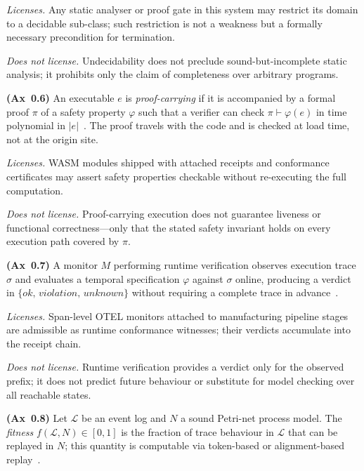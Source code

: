 \noindent\textit{Licenses.}
Any static analyser or proof gate in this system may restrict its domain to a
decidable sub-class; such restriction is not a weakness but a formally
necessary precondition for termination.

\noindent\textit{Does not license.}
Undecidability does not preclude sound-but-incomplete static analysis; it
prohibits only the claim of completeness over arbitrary programs.

\begin{axiom}\label{ax:pcc}
\textbf{(Ax~0.6)}
An executable $e$ is \emph{proof-carrying} if it is accompanied by a formal
proof $\pi$ of a safety property $\varphi$ such that a verifier can check
$\pi \vdash \varphi(e)$ in time polynomial in $|e|$~\cite{necula1997pcc}.
The proof travels with the code and is checked at load time, not at the origin
site.
\end{axiom}

\noindent\textit{Licenses.}
WASM modules shipped with attached receipts and conformance certificates may
assert safety properties checkable without re-executing the full computation.

\noindent\textit{Does not license.}
Proof-carrying execution does not guarantee liveness or functional
correctness—only that the stated safety invariant holds on every execution
path covered by $\pi$.

\begin{axiom}\label{ax:rv}
\textbf{(Ax~0.7)}
A monitor $M$ performing runtime verification observes execution trace $\sigma$
and evaluates a temporal specification $\varphi$ against $\sigma$ online,
producing a verdict in $\{\mathit{ok},\,\mathit{violation},\,\mathit{unknown}\}$
without requiring a complete trace in advance~\cite{leucker2009rv}.
\end{axiom}

\noindent\textit{Licenses.}
Span-level OTEL monitors attached to manufacturing pipeline stages are
admissible as runtime conformance witnesses; their verdicts accumulate into
the receipt chain.

\noindent\textit{Does not license.}
Runtime verification provides a verdict only for the observed prefix; it does
not predict future behaviour or substitute for model checking over all
reachable states.

\begin{axiom}\label{ax:conformance}
\textbf{(Ax~0.8)}
Let $\mathcal{L}$ be an event log and $N$ a sound Petri-net process model.
The \emph{fitness} $f(\mathcal{L}, N) \in [0, 1]$ is the fraction of trace
behaviour in $\mathcal{L}$ that can be replayed in $N$; this quantity is
computable via token-based or alignment-based replay~\cite{vanderaalst2016,adriansyah2014aligning}.
\end{axiom}


